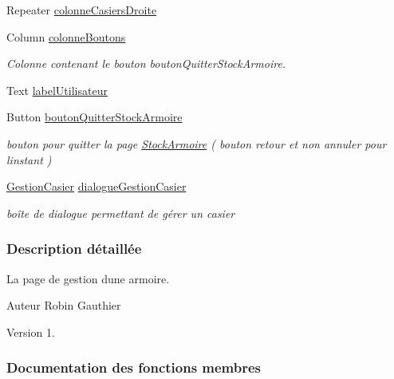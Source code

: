 \begin{DoxyCompactItemize}
Repeater \hyperlink{class_stock_armoire_a14f331f1a570ab77bba3e00cfc91ec55}{colonne\+Casiers\+Droite}
\item 
Column \hyperlink{class_stock_armoire_a247918120576111457dab1e5170fdeb3}{colonne\+Boutons}
\begin{DoxyCompactList}\small\item\em Colonne contenant le bouton bouton\+Quitter\+Stock\+Armoire. \end{DoxyCompactList}\item 
Text \hyperlink{class_stock_armoire_a9c5de07e9aa235e8eb02e50b7e2d6652}{label\+Utilisateur}
\item 
Button \hyperlink{class_stock_armoire_a4788426231673b7572c984b88401b0bb}{bouton\+Quitter\+Stock\+Armoire}
\begin{DoxyCompactList}\small\item\em bouton pour quitter la page \hyperlink{class_stock_armoire}{Stock\+Armoire} ( bouton retour et non annuler pour l\textquotesingle{}instant ) \end{DoxyCompactList}\item 
\hyperlink{class_gestion_casier}{Gestion\+Casier} \hyperlink{class_stock_armoire_a72088d31becde73ccc8cc73d05ab93df}{dialogue\+Gestion\+Casier}
\begin{DoxyCompactList}\small\item\em boîte de dialogue permettant de gérer un casier \end{DoxyCompactList}\end{DoxyCompactItemize}


\subsubsection{Description détaillée}
La page de gestion d\textquotesingle{}une armoire.

\begin{DoxyAuthor}{Auteur}
Robin Gauthier
\end{DoxyAuthor}
\begin{DoxyVersion}{Version}
1. 
\end{DoxyVersion}


\subsubsection{Documentation des fonctions membres}
\mbox{\label{class_stock_armoire_aa8bfe83269e3ba0bb8328257ff80b7fb}} 
